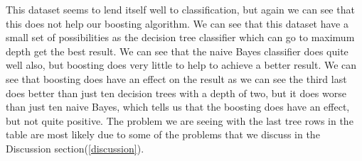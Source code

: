 This dataset seems to lend itself well to classification, but again we can see
that this does not help our boosting algorithm. We can see that this dataset
have a small set of possibilities as the decision tree classifier which can go
to maximum depth get the best result. We can see that the naive Bayes classifier
does quite well also, but boosting does very little to help to achieve a better
result. We can see that boosting does have an effect on the result as we can see
the third last does better than just ten decision trees with a depth of two, but
it does worse than just ten naive Bayes, which tells us that the boosting does
have an effect, but not quite positive. The problem we are seeing with the last
tree rows in the table are most likely due to some of the problems that we
discuss in the Discussion section(\ref{discussion}).
